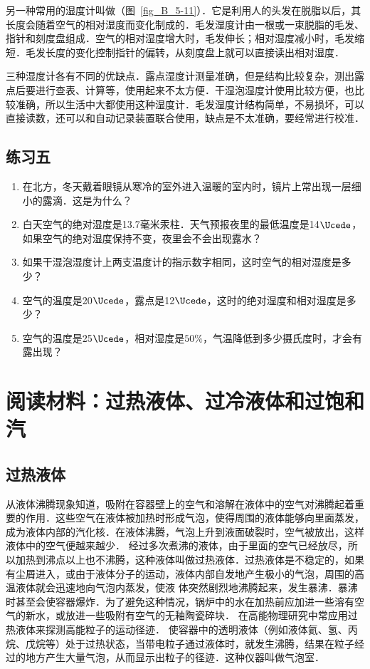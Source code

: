 另一种常用的湿度计叫做（图~\ref{fig_B_5-11}）．它是利用人的头发在脱脂以后，其长度会随着空气的相对湿度而变化制成的．毛发湿度计由一根或一束脱脂的毛发、指针和刻度盘组成．空气的相对湿度增大时，毛发伸长；相对湿度减小时，毛发缩短．毛发长度的变化控制指针的偏转，从刻度盘上就可以直接读出相对湿度．

三种湿度计各有不同的优缺点．露点湿度计测量准确，但是结构比较复杂，测出露点后要进行查表、计算等，使用起来不太方便．干湿泡湿度计使用比较方便，也比较准确，所以生活中大都使用这种湿度计．毛发湿度计结构简单，不易损坏，可以直接读数，还可以和自动记录装置联合使用，缺点是不太准确，要经常进行校准．

\subsection*{练习五}

\begin{enumerate}
\item 在北方，冬天戴着眼镜从寒冷的室外进入温暖的室内时，镜片上常出现一层细小的露滴．这是为什么？
\item 白天空气的绝对湿度是13.7毫米汞柱．天气预报夜里的最低温度是14$\Ucede$，如果空气的绝对湿度保持不变，夜里会不会出现露水？
\item 如果干湿泡湿度计上两支温度计的指示数字相同，这时空气的相对湿度是多少？
\item 空气的温度是20$\Ucede$，露点是12$\Ucede$，这时的绝对湿度和相对湿度是多少？
\item 空气的温度是25$\Ucede$，相对湿度是$50\%$，气温降低到多少摄氏度时，才会有露出现？
\end{enumerate}

\section*{阅读材料：过热液体、过冷液体和过饱和汽}
\subsection*{过热液体} 

从液体沸腾现象知道，吸附在容器壁上的空气和溶解在液体中的空气对沸腾起着重要的作用．这些空气在液体被加热时形成气泡，使得周围的液体能够向里面蒸发，成为液体内部的汽化核．在液体沸腾，气泡上升到液面破裂时，空气被放出，这样液体中的空气便越来越少．
经过多次煮沸的液体，由于里面的空气已经放尽，所以加热到沸点以上也不沸腾，这种液体叫做过热液体．过热液体是不稳定的，如果有尘屑进入，或由于液体分子的运动，液体内部自发地产生极小的气泡，周围的高温液体就会迅速地向气泡内蒸发，使液
体突然剧烈地沸腾起来，发生暴沸．暴沸时甚至会使容器爆炸．为了避免这种情况，锅炉中的水在加热前应加进一些溶有空气的新水，或放进一些吸附有空气的无釉陶瓷碎块．
在高能物理研究中常应用过热液体来探测高能粒子的运动径迹．
使容器中的透明液体（例如液体氦、氢、丙烷、戊烷等）处于过热状态，当带电粒子通过液体时，就发生沸腾，结果在粒子经过的地方产生大量气泡，从而显示出粒子的径迹．这种仪器叫做气泡室．

